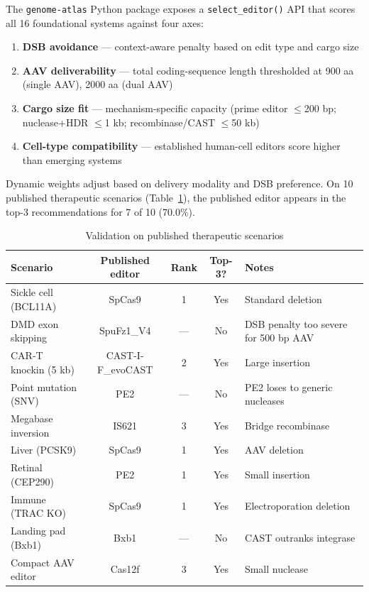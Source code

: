 \documentclass[11pt,a4paper]{article}
\begin{document}
The \texttt{genome-atlas} Python package exposes a \texttt{select\_editor()} API that scores all 16 foundational systems against four axes:
\begin{enumerate}
    \item \textbf{DSB avoidance} --- context-aware penalty based on edit type and cargo size
    \item \textbf{AAV deliverability} --- total coding-sequence length thresholded at 900 aa (single AAV), 2000 aa (dual AAV)
    \item \textbf{Cargo size fit} --- mechanism-specific capacity (prime editor $\leq$200 bp; nuclease+HDR $\leq$1 kb; recombinase/CAST $\leq$50 kb)
    \item \textbf{Cell-type compatibility} --- established human-cell editors score higher than emerging systems
\end{enumerate}
Dynamic weights adjust based on delivery modality and DSB preference. On 10 published therapeutic scenarios (Table~\ref{tab:validation}), the published editor appears in the top-3 recommendations for 7 of 10 (70.0\%).

\begin{table}[ht]
\centering
\caption{Validation on published therapeutic scenarios}
\label{tab:validation}
\begin{tabular}{p{4.5cm}cccp{3cm}}
\toprule
Scenario & Published editor & Rank & Top-3? & Notes \\
\midrule
Sickle cell (BCL11A) & SpCas9 & 1 & Yes & Standard deletion \\
DMD exon skipping & SpuFz1\_V4 & --- & No & DSB penalty too severe for 500 bp AAV \\
CAR-T knockin (5 kb) & CAST-I-F\_evoCAST & 2 & Yes & Large insertion \\
Point mutation (SNV) & PE2 & --- & No & PE2 loses to generic nucleases \\
Megabase inversion & IS621 & 3 & Yes & Bridge recombinase \\
Liver (PCSK9) & SpCas9 & 1 & Yes & AAV deletion \\
Retinal (CEP290) & PE2 & 1 & Yes & Small insertion \\
Immune (TRAC KO) & SpCas9 & 1 & Yes & Electroporation deletion \\
Landing pad (Bxb1) & Bxb1 & --- & No & CAST outranks integrase \\
Compact AAV editor & Cas12f & 3 & Yes & Small nuclease \\
\bottomrule
\end{tabular}
\end{table}
\end{document}

